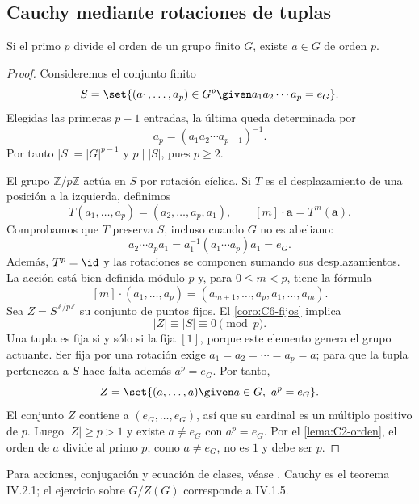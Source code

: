 \subsection{Cauchy mediante rotaciones de tuplas}
\begin{teo}[Cauchy]\label{teo:C6-cauchy}
Si el primo $p$ divide el orden de un grupo finito $G$, existe $a\in G$ de orden $p$.
\end{teo}
\begin{proof}
Consideremos el conjunto finito
\[
S=\set{(a_1,\ldots,a_p)\in G^p\given a_1a_2\cdots a_p=e_G}.
\]
Elegidas las primeras $p-1$ entradas, la última queda determinada por
\[
a_p=(a_1a_2\cdots a_{p-1})^{-1}.
\]
Por tanto $|S|=|G|^{p-1}$ y $p\mid|S|$, pues $p\ge2$.

El grupo $\mathbb Z/p\mathbb Z$ actúa en $S$ por rotación cíclica. Si $T$ es el desplazamiento de una posición a la izquierda, definimos
\[
T(a_1,\ldots,a_p)=(a_2,\ldots,a_p,a_1),\qquad
[m]\cdot\mathbf a=T^m(\mathbf a).
\]
Comprobamos que $T$ preserva $S$, incluso cuando $G$ no es abeliano:
\[
a_2\cdots a_pa_1=a_1^{-1}(a_1\cdots a_p)a_1=e_G.
\]
Además, $T^p=\id$ y las rotaciones se componen sumando sus desplazamientos. La acción está bien definida módulo $p$ y, para $0\le m<p$, tiene la fórmula
\[
[m]\cdot(a_1,\ldots,a_p)
=(a_{m+1},\ldots,a_p,a_1,\ldots,a_m).
\]
Sea $Z=S^{\mathbb Z/p\mathbb Z}$ su conjunto de puntos fijos. El \cref{coro:C6-fijos} implica
\[
|Z|\equiv|S|\equiv0\pmod p.
\]
Una tupla es fija si y sólo si la fija $[1]$, porque este elemento genera el grupo actuante. Ser fija por una rotación exige $a_1=a_2=\cdots=a_p=a$; para que la tupla pertenezca a $S$ hace falta además $a^p=e_G$. Por tanto,
\[
Z=\set{(a,\ldots,a)\given a\in G,\ a^p=e_G}.
\]
El conjunto $Z$ contiene a $(e_G,\ldots,e_G)$, así que su cardinal es un múltiplo positivo de $p$. Luego $|Z|\ge p>1$ y existe $a\ne e_G$ con $a^p=e_G$. Por el \cref{lema:C2-orden}, el orden de $a$ divide al primo $p$; como $a\ne e_G$, no es $1$ y debe ser $p$.
\end{proof}

\begin{obs}
Para acciones, conjugación y ecuación de clases, véase \citet[cap.~II, 9.6--12, y cap.~IV, 1.1/3/5--7/9/11--14]{aluffi2009}. Cauchy es el teorema IV.2.1; el ejercicio sobre $G/Z(G)$ corresponde a IV.1.5.
\end{obs}
